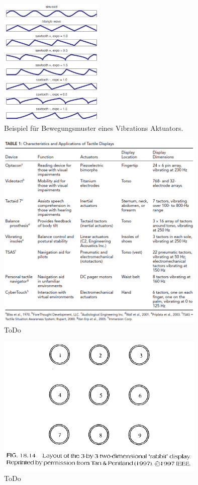 \documentclass{llncs}					%
\begin{document}
\begin{figure}[htbp]
	\begin{center}
		\includegraphics[width = 5cm]{Grafiken/2-Aktivierungsprofile.png}
		\caption{Beispiel für Bewegungsmuster eines Vibrations Aktuators\cite{5444662}. }
		\label{2-Aktivierungsprofile.png}
	\end{center}
\end{figure}

\begin{figure}[htbp]
	\begin{center}
		\includegraphics[width = 10cm]{Grafiken/4-Uebersicht-Projekte.png}
		\caption{ToDo}
		\label{4-Uebersicht-Projekte}
	\end{center}
\end{figure}

\begin{figure}[htbp]
	\begin{center}
		\includegraphics[width = 10cm]{Grafiken/14-3x3-Grid.png}
		\caption{ToDo}
		\label{14-3x3-Grid}
	\end{center}
\end{figure}
\end{document}
